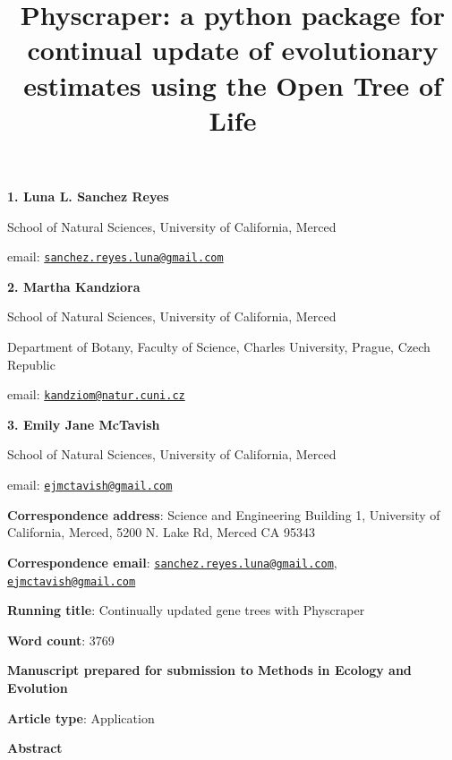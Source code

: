 \documentclass[]{article}
\title{Physcraper: a python package for continual update of evolutionary estimates using the Open Tree of Life}
\author{}
\date{\vspace{-2.5em}}
\begin{document}
\maketitle

\textbf{1. Luna L. Sanchez Reyes}

School of Natural Sciences, University of California, Merced

email: \href{mailto:sanchez.reyes.luna@gmail.com}{\nolinkurl{sanchez.reyes.luna@gmail.com}}

\textbf{2. Martha Kandziora}

School of Natural Sciences, University of California, Merced

Department of Botany, Faculty of Science, Charles University, Prague, Czech Republic

email: \href{mailto:kandziom@natur.cuni.cz}{\nolinkurl{kandziom@natur.cuni.cz}}

\textbf{3. Emily Jane McTavish}

School of Natural Sciences, University of California, Merced

email: \href{mailto:ejmctavish@gmail.com}{\nolinkurl{ejmctavish@gmail.com}}

\textbf{Correspondence address}: Science and Engineering Building 1, University of California, Merced, 5200 N. Lake Rd, Merced CA 95343

\textbf{Correspondence email}: \href{mailto:sanchez.reyes.luna@gmail.com}{\nolinkurl{sanchez.reyes.luna@gmail.com}}, \href{mailto:ejmctavish@gmail.com}{\nolinkurl{ejmctavish@gmail.com}}

\textbf{Running title}: Continually updated gene trees with Physcraper

\textbf{Word count}: 3769

\textbf{Manuscript prepared for submission to Methods in Ecology and Evolution}

\textbf{Article type}: Application

\newpage

\begingroup\Large

\textbf{Abstract}
\endgroup
\end{document}

